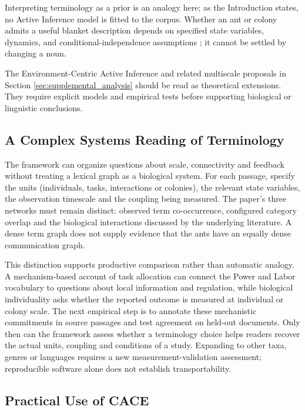 \documentclass[
]{article}
\numberwithin{equation}{section}
\begin{document}
Interpreting terminology as a prior is an analogy here; as the
Introduction states, no Active Inference model is fitted to the corpus.
Whether an ant or colony admits a useful blanket description depends on
specified state variables, dynamics, and conditional-independence
assumptions \citep{friston2013life, kirchhoff2018markov}; it cannot be
settled by changing a noun.

The Environment-Centric Active Inference and related multiscale
proposals in Section \ref{sec:supplemental_analysis} should be read as
theoretical extensions. They require explicit models and empirical tests
before supporting biological or linguistic conclusions.

\subsection{A Complex Systems Reading of
Terminology}\label{a-complex-systems-reading-of-terminology}

The framework can organize questions about scale, connectivity and
feedback without treating a lexical graph as a biological system. For
each passage, specify the units (individuals, tasks, interactions or
colonies), the relevant state variables, the observation timescale and
the coupling being measured. The paper's three networks must remain
distinct: observed term co-occurrence, configured category overlap and
the biological interactions discussed by the underlying literature. A
dense term graph does not supply evidence that the ants have an equally
dense communication graph.

This distinction supports productive comparison rather than automatic
analogy. A mechanism-based account of task allocation can connect the
Power and Labor vocabulary to questions about local information and
regulation, while biological individuality asks whether the reported
outcome is measured at individual or colony scale. The next empirical
step is to annotate these mechanistic commitments in source passages and
test agreement on held-out documents. Only then can the framework assess
whether a terminology choice helps readers recover the actual units,
coupling and conditions of a study. Expanding to other taxa, genres or
languages requires a new measurement-validation assessment; reproducible
software alone does not establish transportability.

\subsection{Practical Use of CACE}\label{practical-use-of-cace}
\end{document}
